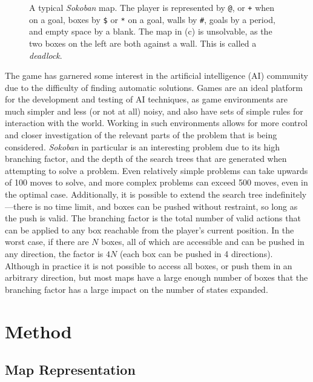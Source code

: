 \documentclass[a4paper,11pt]{article}
\begin{document}
\begin{figure}
  \caption{A typical \emph{Sokoban} map. The player is represented by \texttt{@}, or \texttt{+} when on a goal, boxes by \texttt{\$} or \texttt{*} on a goal, walls by \texttt{\#}, goals by a period, and empty space by a blank. The map in (c) is unsolvable, as the two boxes on the left are both against a wall. This is called a \emph{deadlock}.}
  \label{fig:mapex}
\end{figure}

The game has garnered some interest in the artificial intelligence (AI) community due to the difficulty of finding automatic solutions. Games are an ideal platform for the development and testing of AI techniques, as game environments are much simpler and less (or not at all) noisy, and also have sets of simple rules for interaction with the world. Working in such environments allows for more control and closer investigation of the relevant parts of the problem that is being considered. \emph{Sokoban} in particular is an interesting problem due to its high branching factor, and the depth of the search trees that are generated when attempting to solve a problem. Even relatively simple problems can take upwards of 100 moves to solve, and more complex problems can exceed 500 moves, even in the optimal case. Additionally, it is possible to extend the search tree indefinitely---there is no time limit, and boxes can be pushed without restraint, so long as the push is valid. The branching factor is the total number of valid actions that can be applied to any box reachable from the player's current position. In the worst case, if there are $N$ boxes, all of which are accessible and can be pushed in any direction, the factor is $4N$ (each box can be pushed in 4 directions). Although in practice it is not possible to access all boxes, or push them in an arbitrary direction, but most maps have a large enough number of boxes that the branching factor has a large impact on the number of states expanded.

\section{Method}
\subsection{Map Representation}
\end{document}
